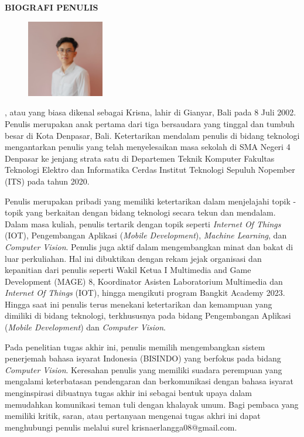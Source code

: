 \begin{center}
  \Large
  \textbf{BIOGRAFI PENULIS}
\end{center}


\vspace{2ex}

\begin{figure}
  \centering
  \vspace{-3ex}
  \includegraphics[width=0.3\textwidth]{gambar/foto-formal.png}
  \vspace{-4ex}
\end{figure}

\name{}, atau yang biasa dikenal sebagai Krisna, lahir di Gianyar, Bali pada 8 Juli 2002. Penulis merupakan anak pertama dari tiga bersaudara yang tinggal dan tumbuh besar di Kota Denpasar, Bali. Ketertarikan mendalam penulis di bidang teknologi mengantarkan penulis yang telah menyelesaikan masa sekolah di SMA Negeri 4 Denpasar ke jenjang strata satu di Departemen Teknik Komputer Fakultas Teknologi Elektro dan Informatika Cerdas Institut Teknologi Sepuluh Nopember (ITS) pada tahun 2020.

Penulis merupakan pribadi yang memiliki ketertarikan dalam menjelajahi topik - topik yang berkaitan dengan bidang teknologi secara tekun dan mendalam. Dalam masa kuliah, penulis tertarik dengan topik seperti \emph{Internet Of Things} (IOT), Pengembangan Aplikasi (\emph{Mobile Development}), \emph{Machine Learning}, dan \emph{Computer Vision}. Penulis juga aktif dalam mengembangkan minat dan bakat di luar perkuliahan. Hal ini dibuktikan dengan rekam jejak organisasi dan kepanitian dari penulis seperti Wakil Ketua I Multimedia and Game Development (MAGE) 8, Koordinator Asisten Laboratorium Multimedia dan \emph{Internet Of Things} (IOT), hingga mengikuti program Bangkit Academy 2023. Hingga saat ini penulis terus menekani ketertarikan dan kemampuan yang dimiliki di bidang teknologi, terkhususnya pada bidang Pengembangan Aplikasi (\emph{Mobile Development}) dan \emph{Computer Vision}.

Pada penelitian tugas akhir ini, penulis memilih mengembangkan sistem penerjemah bahasa isyarat Indonesia (BISINDO) yang berfokus pada bidang \emph{Computer Vision}. Keresahan penulis yang memiliki suadara perempuan yang mengalami keterbatasan pendengaran dan berkomunikasi dengan bahasa isyarat menginspirasi dibuatnya tugas akhir ini sebagai bentuk upaya dalam memudahkan komunikasi teman tuli dengan khalayak umum. Bagi pembaca yang memiliki kritik, saran, atau pertanyaan mengenai tugas akhri ini dapat menghubungi penulis melalui surel krisnaerlangga08@gmail.com.
